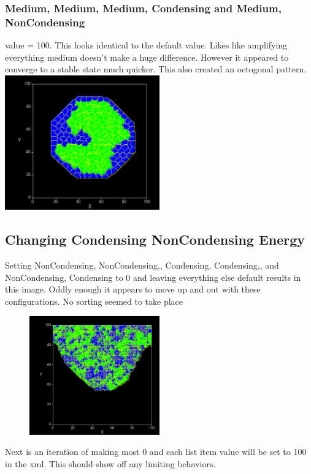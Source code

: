 \documentclass{article}
\begin{document}
\subsubsection{Medium, Medium, Medium, Condensing and Medium, NonCondensing}
value = 100.  This looks identical to the default value.  Likes like amplifying everything medium doesn't make a huge difference.  However it appeared to converge to a stable state much quicker.  This also created an octogonal pattern.
    \includegraphics[width=0.5\textwidth]{mm_mc_mnC100}


\subsection{Changing Condensing NonCondensing Energy}
Setting NonCondensing, NonCondensing,, Condensing, Condensing,, and NonCondensing, Condensing to 0 and leaving everything else default results in this image.  Oddly enough it appears to move up and out with these configurations.  No sorting seemed to take place
\begin{figure}[h]
    \includegraphics[width=0.5\textwidth]{changing_condensing_0s}
\end{figure}
Next is an iteration of making most 0 and each list item value will be set to 100 in the xml.  This should show off any limiting behaviors.
\end{document}
